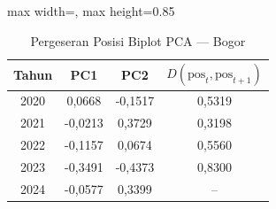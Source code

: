 \begin{table}[H]
\centering
\caption{Pergeseran Posisi Biplot PCA --- Bogor} \label{tab:appjarak_pca_skor_bogor}
\begin{adjustbox}{max width=\textwidth, max height=0.85\textheight}
\begin{tabular}{|c|c|c|c|}
\hline
\textbf{Tahun} & \textbf{PC1} & \textbf{PC2} & \textbf{$D(\text{pos}_t, \text{pos}_{t+1})$} \\
\hline
2020 & 0,0668 & -0,1517 & 0,5319 \\
2021 & -0,0213 & 0,3729 & 0,3198 \\
2022 & -0,1157 & 0,0674 & 0,5560 \\
2023 & -0,3491 & -0,4373 & 0,8300 \\
2024 & -0,0577 & 0,3399 & -- \\
\hline
\end{tabular}
\end{adjustbox}
\end{table}
